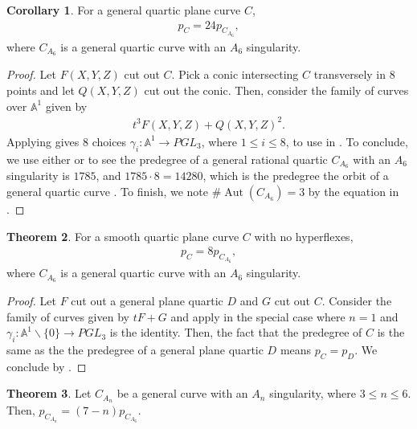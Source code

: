 \documentclass{article}
\newcommand{\rood}[1]{\textcolor{red}{[#1]}}
\theoremstyle{definition}
\newtheorem{thm}{Theorem}[section]
\newtheorem{cor}[thm]{Corollary}
\newcommand{\on}{\operatorname}
\newcommand{\mb}{\mathbb}
\begin{document}
\begin{cor}
\label{cor24}
For a general quartic plane curve $C$, 
\begin{align*}
    p_C = 24 p_{C_{A_6}},
\end{align*}
where $C_{A_6}$ is a general quartic curve with an $A_6$ singularity. 
\end{cor}

\begin{proof}
Let $F(X,Y,Z)$ cut out $C$. Pick a conic intersecting $C$ transversely in 8 points and let $Q(X,Y,Z)$ cut out the conic. Then, consider the family of curves over $\mb{A}^1$ given by
\begin{align*}
    t^3F(X,Y,Z)+Q(X,Y,Z)^2.
\end{align*}
Applying  gives 8 choices $\gamma_i: \mb{A}^1\to PGL_3$, where $1\leq i\leq 8$, to use in . To conclude, we use either \cite[Example 5.4]{AF00} or  to see the predegree of a general rational quartic $C_{A_6}$ with an $A_6$ singularity is $1785$, and $1785\cdot 8=14280$, which is the predegree the orbit of a general quartic curve \cite{AF93}. To finish, we note $\#\on{Aut}(C_{A_6})=3$ by the equation in \cite[Example 5.4]{AF00}.
\end{proof}

\begin{thm}
\label{smooth}
For a smooth quartic plane curve $C$ with no hyperflexes, 
\begin{align*}
    p_C = 8 p_{C_{A_6}},
\end{align*}
where $C_{A_6}$ is a general quartic curve with an $A_6$ singularity.
\end{thm}

\begin{proof}
Let $F$ cut out a general plane quartic $D$ and $G$ cut out $C$. Consider the family of curves given by $tF+G$ and apply  in the special case where $n=1$ and $\gamma_i: \mb{A}^{1}\backslash\{0\}\to PGL_3$ is the identity. Then, the fact that the predegree of $C$ is the same as the the predegree of a general plane quartic $D$ \cite{AF93} means $p_C=p_D$. We conclude by . 
\end{proof}

\begin{thm}
\label{Anorbit}
Let $C_{A_n}$ be a general curve with an $A_n$ singularity, where $3\leq n\leq 6$. Then, $p_{C_{A_n}}=(7-n)p_{C_{A_6}}$.
\end{thm}

\end{document}
